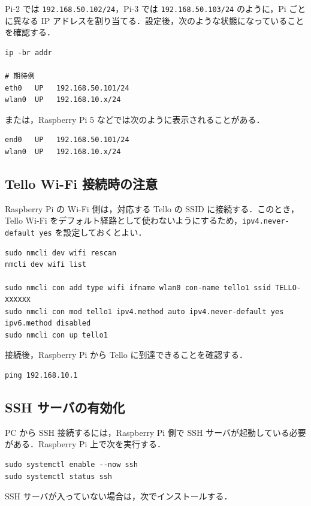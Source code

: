 Pi-2 では \texttt{192.168.50.102/24}，Pi-3 では \texttt{192.168.50.103/24} のように，Pi ごとに異なる IP アドレスを割り当てる．設定後，次のような状態になっていることを確認する．

\begin{lstlisting}
ip -br addr

# 期待例
eth0   UP   192.168.50.101/24
wlan0  UP   192.168.10.x/24
\end{lstlisting}

または，Raspberry Pi 5 などでは次のように表示されることがある．

\begin{lstlisting}
end0   UP   192.168.50.101/24
wlan0  UP   192.168.10.x/24
\end{lstlisting}

\subsection{Tello Wi-Fi 接続時の注意}

Raspberry Pi の Wi-Fi 側は，対応する Tello の SSID に接続する．このとき，Tello Wi-Fi をデフォルト経路として使わないようにするため，\texttt{ipv4.never-default yes} を設定しておくとよい．

\begin{lstlisting}
sudo nmcli dev wifi rescan
nmcli dev wifi list

sudo nmcli con add type wifi ifname wlan0 con-name tello1 ssid TELLO-XXXXXX
sudo nmcli con mod tello1 ipv4.method auto ipv4.never-default yes ipv6.method disabled
sudo nmcli con up tello1
\end{lstlisting}

接続後，Raspberry Pi から Tello に到達できることを確認する．

\begin{lstlisting}
ping 192.168.10.1
\end{lstlisting}

\subsection{SSH サーバの有効化}

PC から SSH 接続するには，Raspberry Pi 側で SSH サーバが起動している必要がある．Raspberry Pi 上で次を実行する．

\begin{lstlisting}
sudo systemctl enable --now ssh
sudo systemctl status ssh
\end{lstlisting}

SSH サーバが入っていない場合は，次でインストールする．

